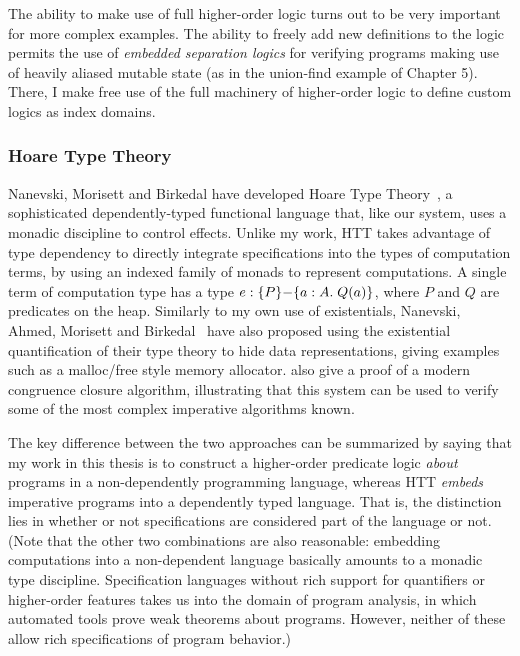 The ability to make use of full higher-order logic turns out to be
very important for more complex examples. The ability to freely add
new definitions to the logic permits the use of \emph{embedded
  separation logics} for verifying programs making use of heavily
aliased mutable state (as in the union-find example of Chapter
5). There, I make free use of the full machinery of higher-order logic
to define custom logics as index domains. 


\subsubsection{Hoare Type Theory}

Nanevski, Morisett and Birkedal have developed Hoare Type
Theory~\cite{htt, nanevski08}, a sophisticated dependently-typed
functional language that, like our system, uses a monadic discipline
to control effects.  Unlike my work, HTT takes advantage of type
dependency to directly integrate specifications into the types of
computation terms, by using an indexed family of monads to represent
computations. A single term of computation type has a type $e :
\{{P}\}{-}\{{a:A}.\;{Q(a)}\}$, where $P$ and $Q$ are predicates on the heap.
Similarly to my own use of existentials, Nanevski, Ahmed, Morisett and
Birkedal~\cite{abstract-htt} have also proposed using the existential
quantification of their type theory to hide data representations,
giving examples such as a malloc/free style memory
allocator. \citet{nanevski-victor-10} also give a proof of a modern
congruence closure algorithm, illustrating that this system can be
used to verify some of the most complex imperative algorithms known.

The key difference between the two approaches can be summarized by
saying that my work in this thesis is to construct a higher-order
predicate logic \emph{about} programs in a non-dependently programming
language, whereas HTT \emph{embeds} imperative programs into a
dependently typed language. That is, the distinction lies in whether
or not specifications are considered part of the language or not.
(Note that the other two combinations are also reasonable: embedding
computations into a non-dependent language basically amounts to a
monadic type discipline. Specification languages without rich support
for quantifiers or higher-order features takes us into the domain of
program analysis, in which automated tools prove weak theorems about
programs. However, neither of these allow rich specifications of
program behavior.)

